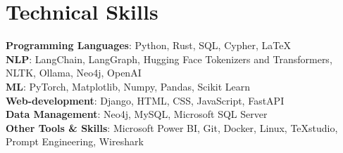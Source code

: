 \documentclass[letterpaper,11pt]{article}
\begin{document}
	
	\section{\textcolor{title-color}{Technical Skills}}
	\begin{itemize}[leftmargin=0.01in, label={}]
		\small{\item{
				\textbf{Programming Languages}{: Python, Rust, SQL, Cypher, \LaTeX} \\
				\textbf{NLP}{: LangChain, LangGraph, Hugging Face Tokenizers and Transformers, NLTK, Ollama, Neo4j, OpenAI} \\
				\textbf{ML}{: PyTorch, Matplotlib, Numpy, Pandas, Scikit Learn} \\
				\textbf{Web-development}{: Django, HTML, CSS, JavaScript, FastAPI} \\
				\textbf{Data Management}{: Neo4j, MySQL, Microsoft SQL Server} \\
				\textbf{Other Tools \& Skills}{: Microsoft Power BI, Git, Docker, Linux, TeXstudio, Prompt Engineering, Wireshark} \\
		}}
	\end{itemize}

	
\end{document}
